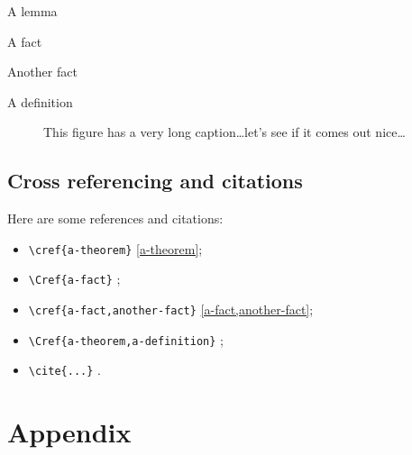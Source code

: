 \documentclass[italian,english]{uniud}
\let\docroot\currfilepath
\newcommand\IfDocRootTF[2]{%
	\ifcurrfilepath{\docroot}{#1}{#2}%
}
\begin{document}
\begin{lemma}
	\label{a-lemma}
	A lemma
\end{lemma}

\begin{fact}
	\label{a-fact}
	A fact
\end{fact}

\begin{fact}
	\label{another-fact}
	Another fact
\end{fact}

\begin{definition}
	\label{a-definition}
	A definition
\end{definition}

\begin{remark}
	\label{a-remark}
	\blindtext[1]
\end{remark}

\begin{figure}[t]
	\begin{center}
	\end{center}
	\caption{This figure has a very long caption\dots let's see if it comes out nice\dots}
	\label{a-figure}
\end{figure}

\section{Cross referencing and citations}

Here are some references and citations: 
\begin{itemize}
	\item \verb|\cref{a-theorem}| \cref{a-theorem};
	\item \verb|| \Cref{a-fact};
	\item \verb|\cref{a-fact,another-fact}| \cref{a-fact,another-fact};
	\item \verb|| \Cref{a-theorem,a-definition};
	\item \verb|\cite{...}| 
	 \cite{article,book,booklet,conference,inbook,incollection,manual,mastersthesis,misc,phdthesis,proceedings,techreport,unpublished}.
\end{itemize}


\IfDocRootTF{A}{B}



\IfDocRootTF{A}{B}


\backmatter

\printbibliography

\appendix

\chapter{Appendix}
\lipsum[1-7]
\end{document}
